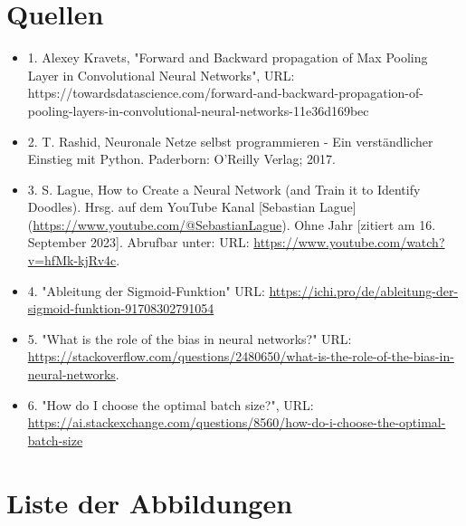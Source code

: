 \documentclass[12pt]{article}
\begin{document}
\section{Quellen}
\begin{itemize}
\item 1. Alexey Kravets, "Forward and Backward propagation of Max Pooling Layer in Convolutional Neural Networks", URL: https://towardsdatascience.com/forward-and-backward-propagation-of-pooling-layers-in-convolutional-neural-networks-11e36d169bec


\item 2. T. Rashid, Neuronale Netze selbst programmieren - Ein verständlicher Einstieg mit Python. Paderborn: O’Reilly Verlag; 2017.
\item 3. S. Lague, How to Create a Neural Network (and Train it to Identify Doodles). Hrsg. auf dem YouTube Kanal [Sebastian Lague](\url{https://www.youtube.com/@SebastianLague}). Ohne Jahr [zitiert am 16. September 2023]. Abrufbar unter: URL: \url{https://www.youtube.com/watch?v=hfMk-kjRv4c}.
\item 4. "Ableitung der Sigmoid-Funktion" URL: \url{https://ichi.pro/de/ableitung-der-sigmoid-funktion-91708302791054}
\item 5. "What is the role of the bias in neural networks?" URL: \url{https://stackoverflow.com/questions/2480650/what-is-the-role-of-the-bias-in-neural-networks}.
\item 6. "How do I choose the optimal batch size?", URL: \url{https://ai.stackexchange.com/questions/8560/how-do-i-choose-the-optimal-batch-size}
\end{itemize}

\cleardoublepage
\section{Liste der Abbildungen}
\listoffigures
\end{document}
